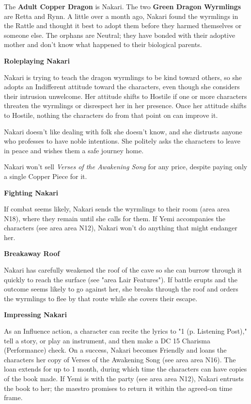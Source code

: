\documentclass[letterpaper, 11pt, twocolumn]{dndbook}
\begin{document}
The \textbf{Adult Copper Dragon} is Nakari. The two \textbf{Green Dragon Wyrmlings} are Retta and Rynn. A little over a month ago, Nakari found the wyrmlings in the Rattle and thought it best to adopt them before they harmed themselves or someone else. The orphans are Neutral; they have bonded with their adoptive mother and don't know what happened to their biological parents.

\textbf{Roleplaying Nakari}

Nakari is trying to teach the dragon wyrmlings to be kind toward others, so she adopts an Indifferent attitude toward the characters, even though she considers their intrusion unwelcome. Her attitude shifts to Hostile if one or more characters threaten the wyrmlings or disrespect her in her presence. Once her attitude shifts to Hostile, nothing the characters do from that point on can improve it.

Nakari doesn't like dealing with folk she doesn't know, and she distrusts anyone who professes to have noble intentions. She politely asks the characters to leave in peace and wishes them a safe journey home.

Nakari won't sell \textit{Verses of the Awakening Song} for any price, despite paying only a single Copper Piece for it.

\textbf{Fighting Nakari}

If combat seems likely, Nakari sends the wyrmlings to their room (area area N18), where they remain until she calls for them. If Yemi accompanies the characters (see area area N12), Nakari won't do anything that might endanger her.

\textbf{Breakaway Roof}

Nakari has carefully weakened the roof of the cave so she can burrow through it quickly to reach the surface (see "area Lair Features"). If battle erupts and the outcome seems likely to go against her, she breaks through the roof and orders the wyrmlings to flee by that route while she covers their escape.

\textbf{Impressing Nakari}

As an Influence action, a character can recite the lyrics to "1 (p. Listening Post)," tell a story, or play an instrument, and then make a DC 15 Charisma (Performance) check. On a success, Nakari becomes Friendly and loans the characters her copy of Verses of the Awakening Song (see area area N16). The loan extends for up to 1 month, during which time the characters can have copies of the book made. If Yemi is with the party (see area area N12), Nakari entrusts the book to her; the maestro promises to return it within the agreed-on time frame.
\end{document}
